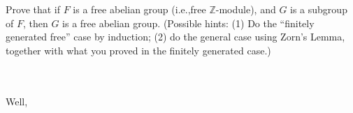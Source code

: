 Prove that if $F$ is a free abelian group (i.e.,free $\mathbb{Z}$-module), and $G$ is a subgroup of $F$,
then $G$ is a free abelian group. (Possible hints: (1) Do the “finitely generated free” case by 
induction; (2) do the general case using Zorn's Lemma, together with what you proved in the finitely
generated case.)\\\\

\begin{solution}\renewcommand{\qedsymbol}{}\ \\
    Well,
\end{solution}